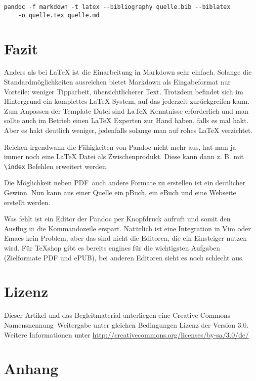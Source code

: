 \documentclass[11pt,ngerman,a4paper]{article}
\begin{document}
\begin{verbatim}
pandoc -f markdown -t latex --bibliography quelle.bib --biblatex 
    -o quelle.tex quelle.md
\end{verbatim}

\section{Fazit}

Anders als bei LaTeX ist die Einarbeitung in Markdown sehr einfach.
Solange die Standardmöglichkeiten ausreichen bietet Markdown als
Eingabeformat nur Vorteile: weniger Tipparbeit, übersichtlicherer Text.
Trotzdem befindet sich im Hintergrund ein komplettes LaTeX System, auf
das jederzeit zurückgreifen kann. Zum Anpassen der Template Datei sind
LaTeX Kenntnisse erforderlich und man sollte auch im Betrieb einen LaTeX
Experten zur Hand haben, falls es mal hakt. Aber es hakt deutlich
weniger, jedenfalls solange man auf rohes LaTeX verzichtet.

Reichen irgendwann die Fähigkeiten von Pandoc nicht mehr aus, hat man ja
immer noch eine LaTeX Datei als Zwischenprodukt. Diese kann dann z. B.
mit \texttt{\textbackslash{}index} Befehlen erweitert werden.

Die Möglichkeit neben PDF~auch andere Formate zu erstellen ist ein
deutlicher Gewinn. Nun kann aus einer Quelle ein pBuch, ein eBuch und
eine Webseite erstellt werden.

Was fehlt ist ein Editor der Pandoc per Knopfdruck aufruft und somit den
Ausflug in die Kommandozeile erspart. Natürlich ist eine Integration in
Vim oder Emacs kein Problem, aber das sind nicht die Editoren, die ein
Einsteiger nutzen wird. Für TeXshop gibt es bereits engines für die
wichtigsten Aufgaben (Zielformate PDF und ePUB), bei anderen Editoren
sieht es noch schlecht aus.

\section{Lizenz}

Dieser Artikel und das Begleitmaterial unterliegen eine Creative Commons
Namensnennung--Weitergabe unter gleichen Bedingungen Lizenz der Version
3.0. Weitere Informationen unter
\url{http://creativecommons.org/licenses/by-sa/3.0/de/}

\section{Anhang}
\end{document}
